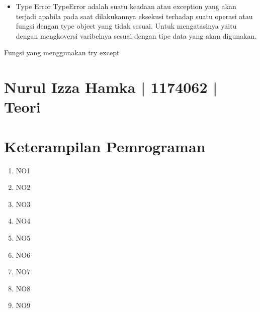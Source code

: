 \begin{enumerate}
\begin{itemize}
\item Type Error
TypeError adalah suatu keadaan atau exception yang akan terjadi apabila pada saat dilakukannya eksekusi terhadap suatu operasi atau fungsi dengan type object yang tidak sesuai. Untuk mengatasinya yaitu dengan mengkoversi varibelnya sesuai dengan tipe data yang akan digunakan.
\end{itemize}

Fungsi yang menggunakan try except


\end{enumerate}


\section{Nurul Izza Hamka | 1174062 | Teori}
\section{Keterampilan Pemrograman}
\begin{enumerate}

\item NO1



\item NO2



\item NO3
	


\item NO4



\item NO5



\item NO6



\item NO7



\item NO8



\item NO9


\end{enumerate}
